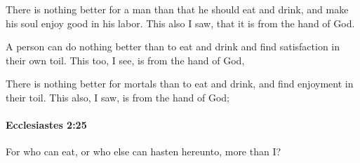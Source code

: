 			\begin{versebox}
					\item[BHS] 
					\item[LXX] 
					\item[ASV] There is nothing better for a man than that he should eat and drink, and make his soul enjoy good in his labor. This also I saw, that it is from the hand of God.
					\item[NIV] A person can do nothing better than to eat and drink and find satisfaction in their own toil. This too, I see, is from the hand of God,
					\item[NRSV] There is nothing better for mortals than to eat and drink, and find enjoyment in their toil. This also, I saw, is from the hand of God;
			\end{versebox}

		\paragraph{Ecclesiastes 2:25} %
			\label{ECCLESIASTES-2-25}

			For who can eat, or who else can hasten hereunto, more than I?

